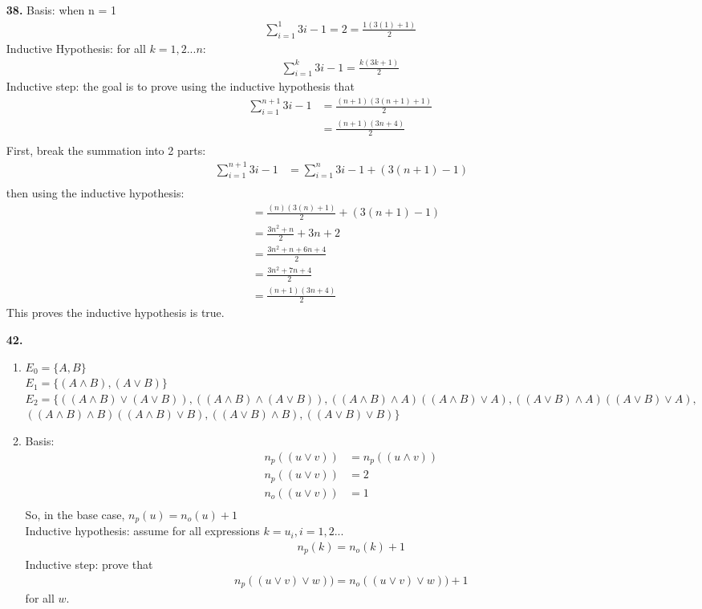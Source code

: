 \documentclass[]{article}
\begin{document}
\begin{flushleft}
\begin{enumerate}
\item[\textbf{38.}]Basis: when n = 1
\begin{align*}
\sum_{i=1}^{1} 3i-1 = 2 = \frac{1(3(1)+1)}{2}\
\end{align*}
Inductive Hypothesis: for all $k=1,2...n$:
\begin{align*}
	\sum_{i=1}^{k} 3i-1 = \frac{k(3k+1)}{2}\
\end{align*}
Inductive step: the goal is to prove using the inductive hypothesis that
\begin{align*}
	\sum_{i=1}^{n+1} 3i-1 &= \frac{(n+1)(3(n+1)+1)}{2}\ \\&= \frac{(n+1)(3n+4)}{2}\ \\
\end{align*}
First, break the summation into 2 parts:
\begin{align*}
	\sum_{i=1}^{n+1} 3i-1 &= \sum_{i=1}^{n} 3i-1 + (3(n+1)-1)\\\
\end{align*}
then using the inductive hypothesis:
\begin{align*}
	&= \frac{(n)(3(n)+1)}{2} + (3(n+1)-1)\\
	&= \frac{3n^2 + n}{2} + 3n + 2\\
	&= \frac{3n^2 + n+6n+4}{2}\\
	&= \frac{3n^2 + 7n +4}{2}\\
	&= \frac{(n+1)(3n+4)}{2}
\end{align*}
This proves the inductive hypothesis is true.

\item[\textbf{42.}]
\begin{enumerate}
	\item $E_0 = \{A,B\}$\\
	$E_1 = \{(A\wedge B),(A\vee B)\}$\\
	$E_2 = \{((A\wedge B)\vee (A\vee B)),((A\wedge B)\wedge (A\vee B)),((A\wedge B)\wedge A)((A\wedge B)\vee A),((A\vee B)\wedge A)((A\vee B)\vee A),$\\
	$((A\wedge B)\wedge B)((A\wedge B)\vee B),((A\vee B)\wedge B),((A\vee B)\vee B) \}$\\
	\item Basis: 
	\begin{align*}
	n_p((u\vee v)) &= n_p((u\wedge v))\\
	n_p((u\vee v)) &= 2\\
	n_o((u\vee v)) &= 1\\
	\end{align*}
	So, in the base case, $n_p(u) = n_o(u) +1$\\
	Inductive hypothesis: assume for all expressions $k = u_i, i = 1,2...$
	\begin{align*}
	n_p(k) = n_o(k)+1
	\end{align*}
	Inductive step: prove that
	\begin{align*}
	n_p((u\vee v)\vee w)) = n_o((u\vee v)\vee w)) + 1
	\end{align*}
	for all $w$.
	

\end{enumerate}
\end{enumerate}
\end{flushleft}
\end{document}
